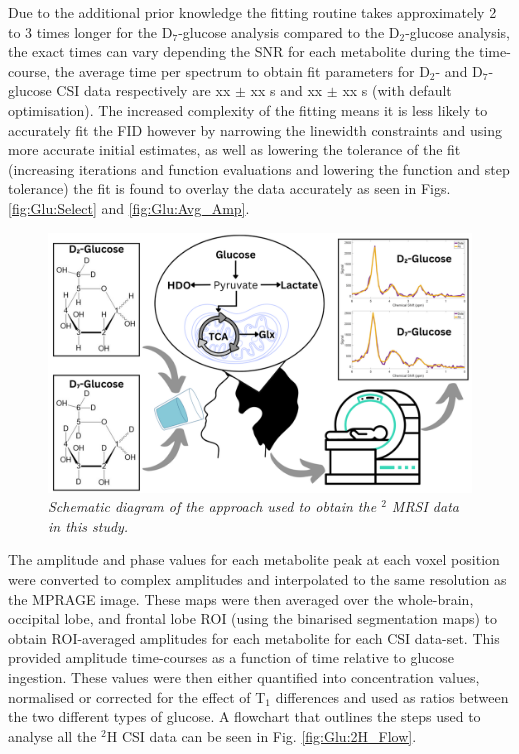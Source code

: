 Due to the additional prior knowledge the fitting routine takes approximately 2 to 3 times longer for the D$_7$-glucose analysis compared to the D$_2$-glucose analysis, the exact times can vary depending the SNR for each metabolite during the time-course, the average time per spectrum to obtain fit parameters for D$_2$- and D$_7$-glucose \ac{CSI} data respectively are xx $\pm$ xx s and xx $\pm$ xx s (with default optimisation). The increased complexity of the fitting means it is less likely to accurately fit the \ac{FID} however by narrowing the linewidth constraints and using more accurate initial estimates, as well as lowering the tolerance of the fit (increasing iterations and function evaluations and lowering the function and step tolerance) the fit is found to overlay the data accurately as seen in Figs. \ref{fig:Glu:Select} and \ref{fig:Glu:Avg_Amp}. 

\begin{figure}
    \centering
    \includegraphics[width = 1\textwidth]{Figures/Glucose/Study_Day.png}
    \caption{\textit{Schematic diagram of the approach used to obtain the $^2$ MRSI data in this study.}}
    \label{fig:Glu:Study_Day}
\end{figure}

The amplitude and phase values for each metabolite peak at each voxel position were converted to complex amplitudes and interpolated to the same resolution as the \ac{MPRAGE} image. These maps were then averaged over the whole-brain, occipital lobe, and frontal lobe \ac{ROI} (using the binarised segmentation maps) to obtain \ac{ROI}-averaged amplitudes for each metabolite for each \ac{CSI} data-set. This provided amplitude time-courses as a function of time relative to glucose ingestion. These values were then either quantified into concentration values, normalised or corrected for the effect of T$_1$ differences and used as ratios between the two different types of glucose. A flowchart that outlines the steps used to analyse all the $^2$H \ac{CSI} data can be seen in Fig. \ref{fig:Glu:2H_Flow}.

